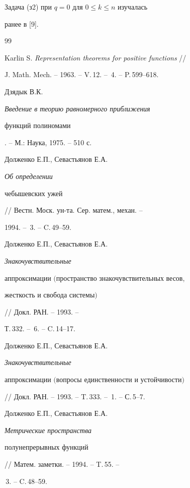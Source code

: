\begin{note} Задача (з2) при $q=0$ для $0\le k\le n$ изучалась 


ранее в [9]. 


\end{note} 


 


\begin{thebibliography}{99} 


 




Karlin S. {\em Representation theorems for positive functions} // 


J. Math. Mech. -- 1963. -- V.\,12. -- \No\,4. -- P.\,599--618. 




Дзядык В.К. {\em Введение в теорию равномерного приближения 


функций полиномами}. -- М.: Наука, 1975. -- 510 с. 




Долженко Е.П., Севастьянов Е.А. {\em Об определении 


чебышевских ужей} // Вестн. Моск. ун-та. Сер. матем., механ. -- 


1994. -- \No\,3. -- C.\,49--59. 




Долженко Е.П., Севастьянов Е.А. {\em Знакочувствительные 


аппроксимации $($пространство знакочувствительных весов, 


жесткость и свобода системы$)$} // Докл. РАН. -- 1993. -- 


Т.\,332. -- \No\,6. -- C.\,14--17. 




Долженко Е.П., Севастьянов Е.А. {\em Знакочувствительные 


аппроксимации $($вопросы единственности и устойчивости$)$} 


// Докл. РАН. -- 1993. -- T.\,333. -- \No\,1. -- С.\,5--7. 




Долженко Е.П., Севастьянов Е.А. {\em Метрические пространства 


полунепрерывных функций} // Матем. заметки. -- 1994. -- T.\,55. -- 


\No\,3. -- C.\,48--59. 





\end{thebibliography}
